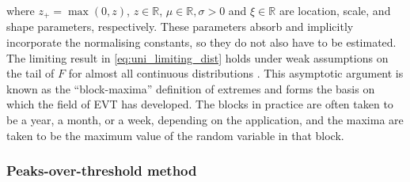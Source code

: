 \documentclass{article}
\numberwithin{equation}{section}
\begin{document}
where $z_+ = \max(0, z)$, $z \in \mathbb{R}$, $\mu \in \mathbb{R}, \sigma > 0$ and $\xi \in \mathbb{R}$ are location, scale, and shape parameters, respectively. 
These parameters absorb and implicitly incorporate the normalising constants, so they do not also have to be estimated. 
The limiting result in \ref{eq:uni_limiting_dist} holds under weak assumptions on the tail of $F$ for almost all continuous distributions \cite{Dupuis2023}. 
This asymptotic argument is known as the ``block-maxima'' definition of extremes and forms the basis on which the field of EVT has developed.
The blocks in practice are often taken to be a year, a month, or a week, depending on the application, and the maxima are taken to be the maximum value of the random variable in that block. %

\subsubsection{Peaks-over-threshold method} \label{subsubsec:pot}
\end{document}
